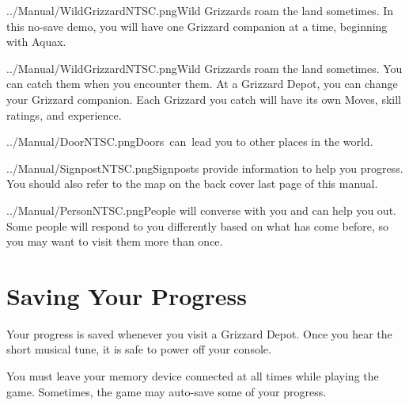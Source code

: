 \documentclass[9pt,twocolumn,openany,article]{memoir}
\newcommand\englishskip{\vspace{14pt}}
\begin{document}
\ifdefined\NOSAVE

\lettrine[image=true,                lines=3,               findent=3pt,
nindent=3pt]{../Manual/WildGrizzardNTSC.png}{}\noindent{}Wild  Grizzards
roam  the land  sometimes.  In  this no-save  demo,  you  will have  one
Grizzard companion at a time, beginning with Aquax.

\else

\lettrine[image=true,                lines=3,               findent=3pt,
nindent=3pt]{../Manual/WildGrizzardNTSC.png}{}\noindent{}Wild  Grizzards
roam the  land sometimes. You  can catch  them when you  encounter them.
At  a   Grizzard  Depot,  you   can  change  your   Grizzard  companion.
Each  Grizzard  you  catch  will  have its  own  Moves,  skill  ratings,
and experience.

\fi

\englishskip

\lettrine[image=true,                lines=3,               findent=3pt,
nindent=3pt]{../Manual/DoorNTSC.png}{}\noindent{}Doors~can~lead  you  to
other places in the world.

\englishskip

\lettrine[image=true,                lines=3,               findent=3pt,
nindent=3pt]{../Manual/SignpostNTSC.png}{}\noindent{}Signposts   provide
information to  help you progress. You  should also refer to  the map on
the  \ifdefined\ATARIAGESAVE  back  cover   \else  last  page  \fi{}  of
this manual.

\englishskip

\lettrine[image=true,                lines=3,               findent=3pt,
nindent=3pt]{../Manual/PersonNTSC.png}{}\noindent{}People  will converse
with  you  and  can help  you  out.  Some  people  will respond  to  you
differently based on what has come before, so you may want to visit them
more than once.


\ifdefined\NOSAVE\else

\section{Saving Your Progress}

Your progress  is saved whenever  you visit  a Grizzard Depot.  Once you
hear the short musical tune, it is safe to power off your console.

\ifdefined\ATARIAGESAVE\else

You must leave  your memory device connected at all  times while playing
the game. Sometimes, the game may auto-save some of your progress.
\end{document}

